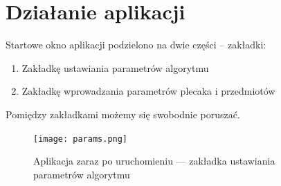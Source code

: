 \documentclass[a4paper,12pt,notitlepage]{mwrep}
\begin{document}
\section{Działanie aplikacji}
Startowe okno aplikacji podzielono na dwie części -- zakładki:
\begin{enumerate}
	\item	Zakładkę ustawiania parametrów algorytmu
	\item	Zakładkę wprowadzania parametrów plecaka i przedmiotów
\end{enumerate}
Pomiędzy zakładkami możemy się swobodnie poruszać.
\begin{figure}[H]
\centering
\texttt{[image: params.png]}
\caption{Aplikacja zaraz po uruchomieniu --- zakładka ustawiania parametrów algorytmu}
\label{fig:params}
\end{figure}
\end{document}
